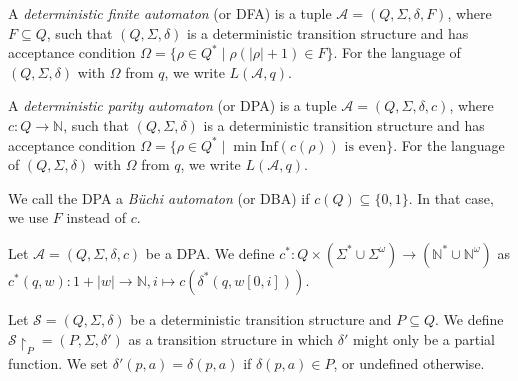 \begin{defn}
	A \emph{deterministic finite automaton} (or DFA) is a tuple $\mathcal{A} = (Q, \Sigma, \delta, F)$, where $F \subseteq Q$, such that $(Q, \Sigma, \delta)$ is a deterministic transition structure and has acceptance condition $\Omega = \{ \rho \in Q^* \mid \rho(|\rho|+1) \in F \}$. For the language of $(Q, \Sigma, \delta)$ with $\Omega$ from $q$, we write $L(\mathcal{A}, q)$.
\end{defn}

\begin{defn}
	A \emph{deterministic parity automaton} (or DPA) is a tuple $\mathcal{A} = (Q, \Sigma, \delta, c)$, where $c : Q \rightarrow \mathbb{N}$, such that $(Q, \Sigma, \delta)$ is a deterministic transition structure and has acceptance condition $\Omega = \{ \rho \in Q^* \mid \min \text{Inf}(c(\rho)) \text{ is even} \}$. For the language of $(Q, \Sigma, \delta)$ with $\Omega$ from $q$, we write $L(\mathcal{A}, q)$.
	
	We call the DPA a \emph{B\"uchi automaton} (or DBA) if $c(Q) \subseteq \{0, 1\}$. In that case, we use $F$ instead of $c$.
\end{defn}

\begin{defn}
	Let $\mathcal{A} = (Q, \Sigma, \delta, c)$ be a DPA. We define $c^* : Q \times (\Sigma^* \cup \Sigma^\omega) \rightarrow (\mathbb{N}^* \cup \mathbb{N}^\omega)$ as $c^*(q, w) : 1+|w| \rightarrow \mathbb{N}, i \mapsto c(\delta^*(q, w[0, i]))$.
\end{defn}

\begin{defn}
	Let $\mathcal{S} = (Q, \Sigma, \delta)$ be a deterministic transition structure and $P \subseteq Q$. We define $\mathcal{S} \upharpoonright_P = (P, \Sigma, \delta')$ as a transition structure in which $\delta'$ might only be a partial function. We set $\delta'(p, a) = \delta(p, a)$ if $\delta(p, a) \in P$, or undefined otherwise.
\end{defn}

